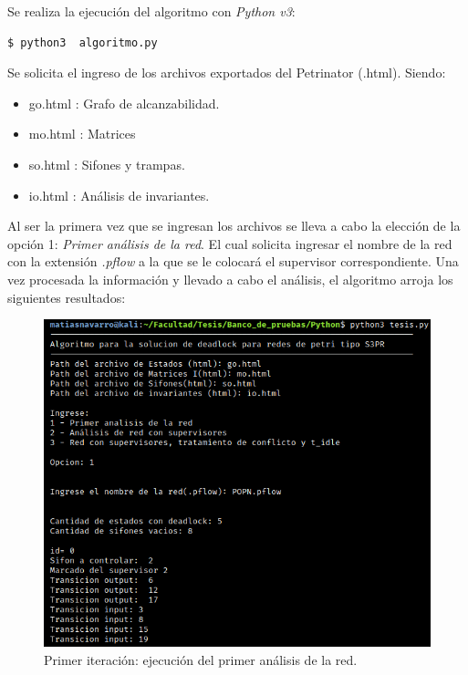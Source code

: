 \noindent Se realiza la ejecución del algoritmo con \textit{Python v3}:
\begin{lstlisting}[language=SHELXL]
    		$ python3  algoritmo.py
\end{lstlisting}
\bigskip

\noindent Se solicita el ingreso de los archivos exportados del Petrinator (.html). Siendo:

\begin{itemize}
    \item go.html : Grafo de alcanzabilidad.
    \item mo.html : Matrices
    \item so.html : Sifones y trampas.
    \item io.html : Análisis de invariantes.
\end{itemize}
\bigskip

\noindent Al ser la primera vez que se ingresan los archivos se lleva a cabo la elección de la opción 1: \textit{Primer análisis de la red}. El cual solicita ingresar el nombre de la red con la extensión \textit{.pflow} a la que se le colocará el supervisor correspondiente.
Una vez procesada la información y llevado a cabo el análisis, el algoritmo arroja los siguientes resultados:
\bigskip

\begin{figure} [H]
    \centering
    \includegraphics[scale=0.8]{Figures/apendiceB/Py-POPN1.png}
    \caption{Primer iteración: ejecución del primer análisis de la red.}
    \label{fig:b-popn1}
\end{figure}

